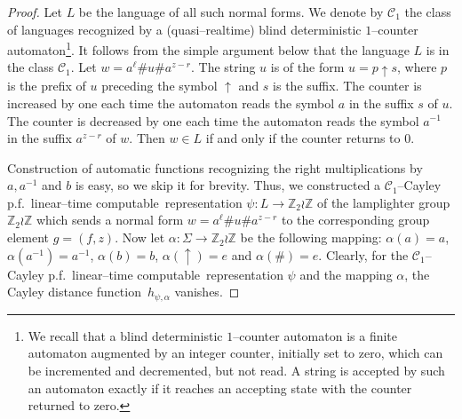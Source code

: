 \documentclass[article,12pt]{elsarticle}
\newcommand\distfun{Cayley distance function}
\newcommand\linearC{Cayley p.f.~linear--time computable}
\begin{document}
\begin{proof}
 	 
 	 Let $L$ be the language of all such normal forms. 
 	 We denote by $\mathscr{C}_1$ the class of
 	 languages recognized by 
 	 a (quasi--realtime) blind deterministic $1$--counter 
 	 automaton\footnote{We recall that a blind deterministic 
 	 	$1$--counter automaton is a finite automaton 
 	 	augmented by an integer counter, initially 
 	 	set to zero, which can be incremented and decremented, 
 	 	but not read. A string is accepted by such an automaton
 	 	exactly if it reaches an accepting state with the counter
 	 	returned to zero.}.
 	 It follows from the simple argument below that 
 	 the language $L$ is in the class $\mathscr{C}_1$.    
 	 Let $w = a^{\ell} \# u \# a^{z-r}$.  
 	 The string $u$ is of the form $u = p \uparrow s$, where
 	 $p$ is the prefix of $u$ preceding the symbol 
 	 $\uparrow$ and $s$ is the suffix. 
 	 The counter is increased by one each time the automaton 
 	 reads the symbol $a$ in the suffix $s$ of $u$. The counter 
 	 is decreased by one each time the automaton reads 
 	 the symbol $a^{-1}$ in the suffix $a^{z-r}$ of $w$. 
 	 Then $w \in L$ if and only if the counter returns to 
 	 $0$.       
 	 
 	 Construction of automatic functions recognizing 
 	 the right multiplications by $a,a^{-1}$ and $b$ is 
 	 easy, so we skip it for brevity. 
 	 Thus, we constructed a 
 	 $\mathscr{C}_1$--\linearC\ representation 
 	 $\psi : L \rightarrow \mathbb{Z}_2 \wr \mathbb{Z}$ 
 	 of the lamplighter 
 	 group $\mathbb{Z}_2 \wr \mathbb{Z}$ which sends
 	 a normal form $w = a^{\ell} \# u \# a^{z-r}$
 	 to the corresponding group element 
 	 $g=(f,z)$. 
 	 Now let $\alpha: \Sigma \rightarrow \mathbb{Z}_2 \wr \mathbb{Z}$ be the following 
 	 mapping: $\alpha (a)= a$, $\alpha (a^{-1})= a^{-1}$, 
 	 $\alpha (b) = b$, $\alpha (\uparrow) = e$ and
 	 $\alpha (\#) = e$. Clearly, for the 
 	 $\mathscr{C}_1$--\linearC\ representation $\psi$ and 
 	 the mapping $\alpha$, the \distfun\
 	 $h_{\psi,\alpha}$ 
 	 vanishes.    
 \end{proof}	
\end{document}
